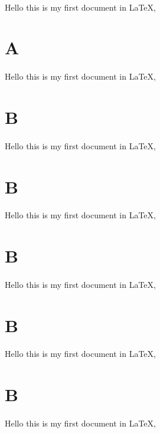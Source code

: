 \documentclass{article}
\begin{document}
    \paragraph{}
    Hello this is  my first document in LaTeX,\\
    \section{A}
    \paragraph{}
Hello this is  my first document in LaTeX,\\
    \section{B}
    \paragraph{}
    Hello this is  my first document in LaTeX,\\
    \section{B}
    \paragraph{}
    Hello this is  my first document in LaTeX,\\
    \section{B}
    \paragraph{}
    Hello this is  my first document in LaTeX,\\
    \section{B}
    \paragraph{}
    Hello this is  my first document in LaTeX,\\
    \setcounter{page}{1}
    \section{B}
    \paragraph{}
    Hello this is  my first document in LaTeX,\\
\end{document}
